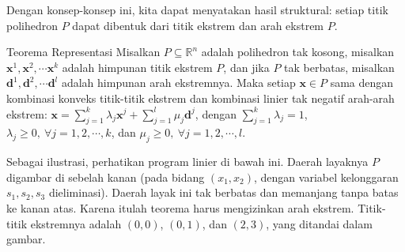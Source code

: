 \medskip
Dengan konsep-konsep ini, kita dapat menyatakan hasil struktural: setiap titik polihedron \( P \) dapat dibentuk dari titik ekstrem dan arah ekstrem \( P \).

\begin{theorem}{Teorema Representasi}
\label{thm:representation}
 Misalkan \( P \subseteq \mathbb{R}^n \) adalah polihedron tak kosong, misalkan $\mathbf{x}^1, \mathbf{x}^2,\cdots \mathbf{x}^k$ adalah himpunan titik ekstrem $P$, dan jika $P$ tak berbatas, misalkan $\mathbf{d}^1, \mathbf{d}^2,\cdots \mathbf{d}^l$ adalah himpunan arah ekstremnya. Maka setiap $\mathbf{x} \in P$ sama dengan kombinasi konveks titik-titik ekstrem dan kombinasi linier tak negatif arah-arah ekstrem: $\mathbf{x} = \sum_{j=1}^k \lambda_j \mathbf{x}^j + \sum_{j=1}^l \mu_j \mathbf{d}^j$, dengan $\sum_{j=1}^k \lambda_j = 1$, $\lambda_j \ge 0,~\forall  j=1,2,\cdots,k$, dan $\mu_j \ge 0,~\forall j=1,2,\cdots,l$.
 \end{theorem}

Sebagai ilustrasi, perhatikan program linier di bawah ini. Daerah layaknya \( P \) digambar di sebelah kanan (pada bidang \((x_1,x_2)\), dengan variabel kelonggaran \(s_1, s_2, s_3\) dieliminasi). Daerah layak ini tak berbatas dan memanjang tanpa batas ke kanan atas. Karena itulah teorema harus mengizinkan arah ekstrem. Titik-titik ekstremnya adalah \((0,0)\), \((0,1)\), dan \((2,3)\), yang ditandai dalam gambar.

